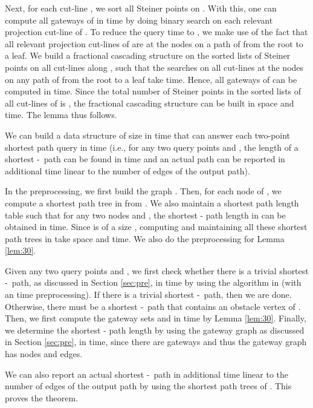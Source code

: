 \documentclass[english,runningheads,11pt]{llncs}
\def\st{-}
\newenvironment{proof}{\noindent {\textbf{Proof:}}\rm}{\hfill \rm}
\begin{document}
\begin{proof}
Next, for each cut-line , we sort all Steiner points on . With this, one can compute all gateways of
 in  time by doing binary search on each relevant projection cut-line of .
To reduce the query time to , we make use of the fact that all relevant projection cut-lines of  are at the nodes on a path of  from the root to a leaf.
We build a fractional cascading structure \cite{ref:ChazelleFr86}
on the sorted lists of Steiner points on all cut-lines along , such that the searches on all cut-lines at the nodes on any path of  from the root to a leaf take  time.
Hence, all gateways of  can be computed in  time. Since the total number of Steiner points
in the sorted lists of all cut-lines of  is , the fractional cascading structure can be built in  space and   time.
The lemma thus follows.
\end{proof}

\begin{theorem}\label{theo:10}
We can build a data structure of size  in  time that can
answer each two-point  shortest path query in  time (i.e., for
any two query points  and , the length of a shortest \st\ path can be found in 
time and an actual path can be reported in additional time linear to the number of edges of the output path).
\end{theorem}
\begin{proof}
In the preprocessing, we first build the graph . Then, for each node  of , we compute a shortest path tree in  from . We also maintain a shortest path length table such that
for any two nodes  and , the shortest - path length in  can be obtained in  time. Since  is of a size , computing and
maintaining all these shortest
path trees in  take  space and
 time.
We also do the preprocessing for Lemma \ref{lem:30}.

Given any two query points  and , we first check whether there
is a trivial shortest \st\ path, as discussed in Section
\ref{sec:pre}, in  time by using the algorithm
in \cite{ref:ChenSh00} (with an  time preprocessing). If
there is a trivial shortest \st\ path, then we are done.
Otherwise, there must be a shortest \st\ path that contains an
obstacle vertex of . Then, we first compute the gateway sets
 and  in  time by Lemma
\ref{lem:30}. Finally, we determine the shortest - path length
by using the gateway graph as discussed in Section \ref{sec:pre}, in
 time, since there are  gateways and thus
the gateway graph has  nodes and  edges.

We can also report an actual shortest \st\ path in additional time linear to the number of edges of the output path by using the shortest path trees of .
This proves the theorem.
\end{proof}
\end{document}

